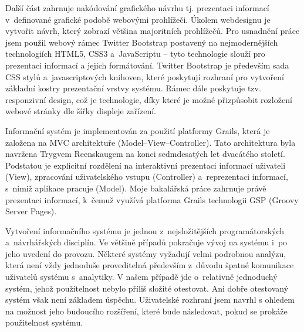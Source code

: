 Další část zahrnuje nakódování grafického návrhu tj. prezentaci informací v~definované grafické podobě webovými prohlížeči. Úkolem webdesignu je vytvořit návrh, který zobrazí většina majoritních prohlížečů. Pro usnadnění práce jsem použil webový rámec Twitter Bootstrap postavený na nejmodernějších technologiích HTML5, CSS3 a~JavaScriptu -- tyto technologie slouží pro prezentaci informací a jejich formátování. Twitter Bootstrap je především sada CSS stylů a~javascriptových knihoven, které poskytují rozhraní pro vytvoření základní kostry prezentační vrstvy systému. Rámec dále poskytuje tzv. responzivní design, což je technologie, díky které je možné přizpůsobit rozložení webové stránky dle šířky displeje zařízení.

Informační systém je implementován za použití platformy Grails, která je založena na MVC architektuře (Model--View--Controller). Tato architektura byla navržena Trygvem Reenskaugem na konci sedmdesatých let dvacátého století. Podstatou je explicitní rozdělení na interaktivní prezentaci informací uživateli (View), zpracování uživatelského vstupu (Controller) a~reprezentaci informací, s~nimiž aplikace pracuje (Model). Moje bakalářská práce zahrnuje právě prezentaci informací, k~čemuž využívá platforma Grails technologii GSP (Groovy Server Pages).

Vytvoření informačního systému je jednou z~nejsložitějších programátorských a~návrhářských disciplín. Ve většině případů pokračuje vývoj na systému i~po jeho uvedení do provozu. Některé systémy vyžadují velmi podrobnou analýzu, která není vždy jednoduše proveditelná především z~důvodu špatné komunikace uživatelů systému s~analytiky. V našem případě jde o~relativně jednoduchý systém, jehož použitelnost nebylo příliš složité otestovat. Ani dobře otestovaný systém však není základem úspěchu. Uživatelské rozhraní jsem navrhl s ohledem na možnost jeho budoucího rozšíření, které bude následovat, pokud se prokáže použitelnost systému.
